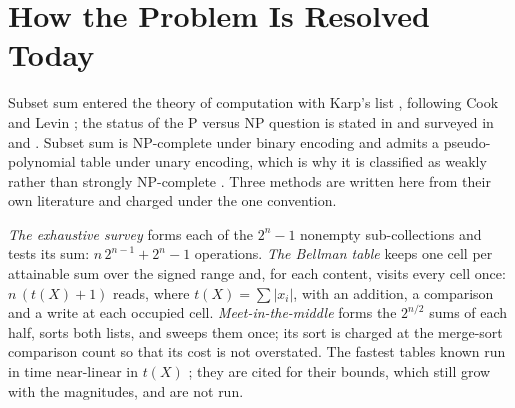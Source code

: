 \documentclass[pdflatex,sn-mathphys-num]{sn-jnl}
\theoremstyle{thmstyleone}%
\theoremstyle{thmstyletwo}%
\theoremstyle{thmstylethree}%
\begin{document}
\section{How the Problem Is Resolved Today}\label{sec:today}
Subset sum entered the theory of computation with Karp's list \citep{Karp1972}, following Cook \citep{Cook1971} and Levin \citep{Levin1973}; the status of the P versus NP question is stated in \citet{Cook2000} and surveyed in \citet{Fortnow2009} and \citet{Aaronson2016}. Subset sum is NP-complete under binary encoding and admits a pseudo-polynomial table under unary encoding, which is why it is classified as weakly rather than strongly NP-complete \citep{GareyJohnson1979,Papadimitriou1994,AroraBarak2009,Sipser2012}. Three methods are written here from their own literature and charged under the one convention.

\emph{The exhaustive survey} forms each of the $2^n-1$ nonempty sub-collections and tests its sum: $n\,2^{n-1}+2^n-1$ operations. \emph{The Bellman table} \citep{Bellman1957} keeps one cell per attainable sum over the signed range and, for each content, visits every cell once: $n\,(t(X)+1)$ reads, where $t(X)=\sum|x_i|$, with an addition, a comparison and a write at each occupied cell. \emph{Meet-in-the-middle} \citep{HorowitzSahni1974} forms the $2^{n/2}$ sums of each half, sorts both lists, and sweeps them once; its sort is charged at the merge-sort comparison count so that its cost is not overstated. The fastest tables known run in time near-linear in $t(X)$ \citep{KoiliarisXu2017,Bringmann2017}; they are cited for their bounds, which still grow with the magnitudes, and are not run.
\end{document}
